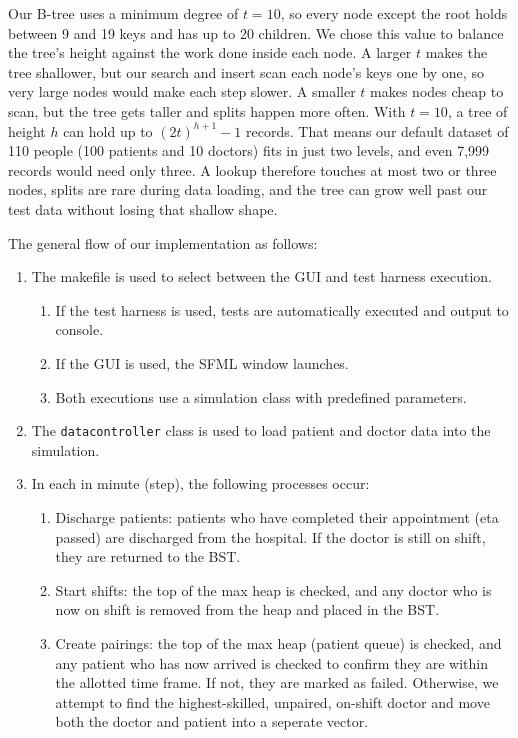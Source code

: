 \documentclass[11pt]{article}
\theoremstyle{plain}
\theoremstyle{definition}
\begin{document}
Our B-tree uses a minimum degree of $t = 10$, so every node except the root holds between 9 and 19 keys and has up to 20 children. We chose this value to balance the tree's height against the work done inside each node. A larger $t$ makes the tree shallower, but our search and insert scan each node's keys one by one, so very large nodes would make each step slower. A smaller $t$ makes nodes cheap to scan, but the tree gets taller and splits happen more often. With $t = 10$, a tree of height $h$ can hold up to $(2t)^{h+1} - 1$ records. That means our default dataset of 110 people (100 patients and 10 doctors) fits in just two levels, and even 7{,}999 records would need only three. A lookup therefore touches at most two or three nodes, splits are rare during data loading, and the tree can grow well past our test data without losing that shallow shape.

The general flow of our implementation as follows:
\begin{enumerate}
  \item The makefile is used to select between the GUI and test harness execution.
  \begin{enumerate}
    \item If the test harness is used, tests are automatically executed and output to console.
    \item If the GUI is used, the SFML window launches.
    \item Both executions use a simulation class with predefined parameters.
  \end{enumerate}
  \item The \texttt{datacontroller} class is used to load patient and doctor data into the simulation.
  \item In each in minute (step), the following processes occur:
  \begin{enumerate}
    \item Discharge patients: patients who have completed their appointment (eta passed) are discharged from the hospital. If the doctor is still on shift, they are returned to the BST.
    \item Start shifts: the top of the max heap is checked, and any doctor who is now on shift is removed from the heap and placed in the BST.
    \item Create pairings: the top of the max heap (patient queue) is checked, and any patient who has now arrived is checked to confirm they are within the allotted time frame. If not, they are marked as failed. Otherwise, we attempt to find the highest-skilled, unpaired, on-shift doctor and move both the doctor and patient into a seperate vector. 
  \end{enumerate}
\end{enumerate}
\end{document}
